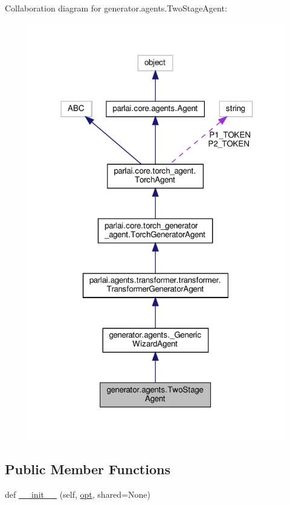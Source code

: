 Collaboration diagram for generator.\+agents.\+Two\+Stage\+Agent\+:
\nopagebreak
\begin{figure}[H]
\begin{center}
\leavevmode
\includegraphics[width=318pt]{classgenerator_1_1agents_1_1TwoStageAgent__coll__graph}
\end{center}
\end{figure}
\subsection*{Public Member Functions}
\begin{DoxyCompactItemize}
\item 
def \hyperlink{classgenerator_1_1agents_1_1TwoStageAgent_ac7d1af4e6371e79f58eb0449b557d87d}{\+\_\+\+\_\+init\+\_\+\+\_\+} (self, \hyperlink{classparlai_1_1core_1_1torch__agent_1_1TorchAgent_a785bb920cf8c8afc3e9bf6a8b77e335a}{opt}, shared=None)
\end{DoxyCompactItemize}
